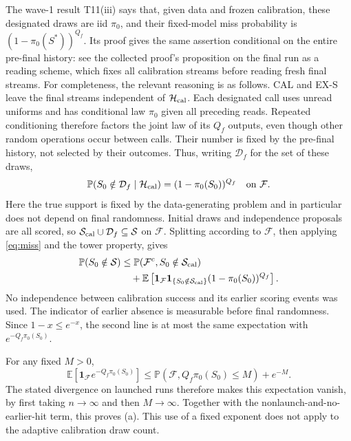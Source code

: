 ﻿\documentclass[11pt]{article}
\newcommand{\Pp}{\mathbb P}
\newcommand{\E}{\mathbb E}
\newcommand{\1}{\mathbf 1}
\newcommand{\Sc}{\mathcal S}
\newcommand{\Fc}{\mathcal F}
\begin{document}
The wave-1 result T11(iii) says that, given data and frozen calibration, these
designated draws are iid \(\pi_0\), and their fixed-model miss probability is
\((1-\pi_0(S^*))^{Q_f}\). Its proof gives the same assertion conditional on
the entire pre-final history: see the collected proof's proposition on the
final run as a reading scheme, which fixes all calibration streams before
reading fresh final streams. For completeness, the relevant reasoning is as
follows. CAL and EX-S leave the final streams independent of
\(\mathcal H_{\rm cal}\). Each designated call uses unread uniforms and
has conditional law \(\pi_0\) given all preceding reads. Repeated conditioning
therefore factors the joint law of its \(Q_f\) outputs, even though other
random operations occur between calls. Their number is fixed by the pre-final
history, not selected by their outcomes. Thus, writing \(\mathcal D_f\) for
the set of these draws,
\begin{equation}\label{eq:miss}
 \Pp(S_0\notin\mathcal D_f\mid\mathcal H_{\rm cal})
 =(1-\pi_0(S_0))^{Q_f}\quad\hbox{on }\Fc.
\end{equation}
Here the true support is fixed by the data-generating problem and in particular
does not depend on final randomness. Initial draws and independence proposals
are all scored, so \(\Sc_{\rm cal}\cup\mathcal D_f\subseteq\Sc\) on
\(\Fc\). Splitting according to \(\Fc\), then applying
\eqref{eq:miss} and the tower property, gives
\begin{align}
 \Pp(S_0\notin\Sc)
 &\le\Pp(\Fc^c,S_0\notin\Sc_{\rm cal})\notag\\
 &\quad+\E\left[\1_{\Fc}\1_{\{S_0\notin\Sc_{\rm cal}\}}
       (1-\pi_0(S_0))^{Q_f}\right].\label{eq:a}
\end{align}
No independence between calibration success and its earlier scoring events
was used. The indicator of earlier absence is measurable before final
randomness. Since \(1-x\le e^{-x}\), the second line is at most the
same expectation with \(e^{-Q_f\pi_0(S_0)}\).

For any fixed \(M>0\),
\[
 \E[\1_{\Fc}e^{-Q_f\pi_0(S_0)}]
 \le\Pp(\Fc,Q_f\pi_0(S_0)\le M)+e^{-M}.
\]
The stated divergence on launched runs therefore makes this expectation
vanish, by first taking \(n\to\infty\) and then \(M\to\infty\).
Together with the nonlaunch-and-no-earlier-hit term, this proves (a).
This use of a fixed exponent does not apply to the adaptive calibration draw
count.
\end{document}

